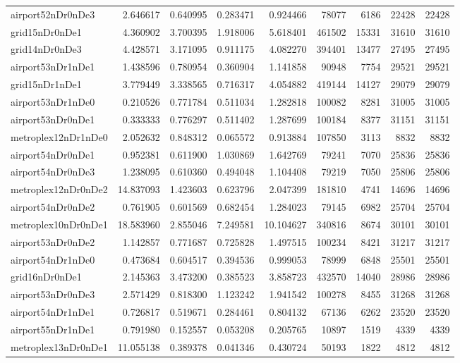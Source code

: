 \documentclass[../../../thesis.tex]{subfiles}
\begin{document}
\begin{longtable}{|l|r|r|r|r|r|r|r|r|}
airport52nDr0nDe3 & 2.646617 & 0.640995 & 0.283471 & 0.924466 & 78077 & 6186 & 22428 & 22428 \\
grid15nDr0nDe1 & 4.360902 & 3.700395 & 1.918006 & 5.618401 & 461502 & 15331 & 31610 & 31610 \\
grid14nDr0nDe3 & 4.428571 & 3.171095 & 0.911175 & 4.082270 & 394401 & 13477 & 27495 & 27495 \\
airport53nDr1nDe1 & 1.438596 & 0.780954 & 0.360904 & 1.141858 & 90948 & 7754 & 29521 & 29521 \\
grid15nDr1nDe1 & 3.779449 & 3.338565 & 0.716317 & 4.054882 & 419144 & 14127 & 29079 & 29079 \\
airport53nDr1nDe0 & 0.210526 & 0.771784 & 0.511034 & 1.282818 & 100082 & 8281 & 31005 & 31005 \\
airport53nDr0nDe1 & 0.333333 & 0.776297 & 0.511402 & 1.287699 & 100184 & 8377 & 31151 & 31151 \\
metroplex12nDr1nDe0 & 2.052632 & 0.848312 & 0.065572 & 0.913884 & 107850 & 3113 & 8832 & 8832 \\
airport54nDr0nDe1 & 0.952381 & 0.611900 & 1.030869 & 1.642769 & 79241 & 7070 & 25836 & 25836 \\
airport54nDr0nDe3 & 1.238095 & 0.610360 & 0.494048 & 1.104408 & 79219 & 7050 & 25806 & 25806 \\
metroplex12nDr0nDe2 & 14.837093 & 1.423603 & 0.623796 & 2.047399 & 181810 & 4741 & 14696 & 14696 \\
airport54nDr0nDe2 & 0.761905 & 0.601569 & 0.682454 & 1.284023 & 79145 & 6982 & 25704 & 25704 \\
metroplex10nDr0nDe1 & 18.583960 & 2.855046 & 7.249581 & 10.104627 & 340816 & 8674 & 30101 & 30101 \\
airport53nDr0nDe2 & 1.142857 & 0.771687 & 0.725828 & 1.497515 & 100234 & 8421 & 31217 & 31217 \\
airport54nDr1nDe0 & 0.473684 & 0.604517 & 0.394536 & 0.999053 & 78999 & 6848 & 25501 & 25501 \\
grid16nDr0nDe1 & 2.145363 & 3.473200 & 0.385523 & 3.858723 & 432570 & 14040 & 28986 & 28986 \\
airport53nDr0nDe3 & 2.571429 & 0.818300 & 1.123242 & 1.941542 & 100278 & 8455 & 31268 & 31268 \\
airport54nDr1nDe1 & 0.726817 & 0.519671 & 0.284461 & 0.804132 & 67136 & 6262 & 23520 & 23520 \\
airport55nDr1nDe1 & 0.791980 & 0.152557 & 0.053208 & 0.205765 & 10897 & 1519 & 4339 & 4339 \\
metroplex13nDr0nDe1 & 11.055138 & 0.389378 & 0.041346 & 0.430724 & 50193 & 1822 & 4812 & 4812 \\

\end{longtable}
\end{document}
